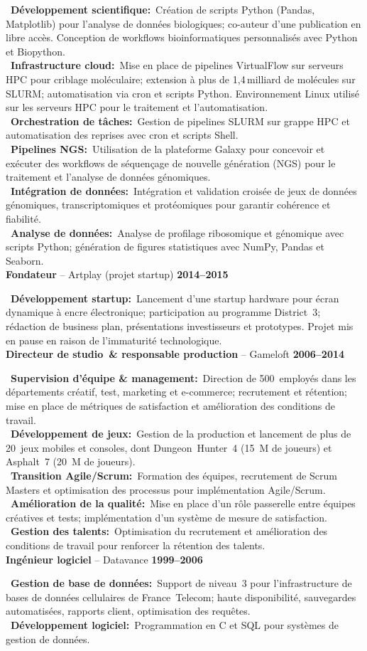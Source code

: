 \documentclass[a4paper,10pt]{article}
\newcommand{\resumeItem}[3]{%
  \noindent\textbf{#1} -- #2 \hfill \textbf{#3} \\
  \vspace{0.3em}
}
\newcommand{\jobItem}[2]{%
  \noindent
  \textbullet\ \textbf{#1\ifthenelse{\boolean{EN}}{}{ }:}~#2\vspace{0.3em} \\
}
\begin{document}
{{    \jobItem{Développement scientifique}{Création de scripts Python (Pandas, Matplotlib) pour l'analyse de données biologiques; co-auteur d’une publication en libre accès. Conception de workflows bioinformatiques personnalisés avec Python et Biopython.}
    \jobItem{Infrastructure cloud}{Mise en place de pipelines VirtualFlow sur serveurs HPC pour criblage moléculaire; extension à plus de 1,4 milliard de molécules sur SLURM; automatisation via cron et scripts Python. Environnement Linux utilisé sur les serveurs HPC pour le traitement et l'automatisation.}
    \jobItem{Orchestration de tâches}{Gestion de pipelines SLURM sur grappe HPC et automatisation des reprises avec cron et scripts Shell.}
    \jobItem{Pipelines NGS}{Utilisation de la plateforme Galaxy pour concevoir et exécuter des workflows de séquençage de nouvelle génération (NGS) pour le traitement et l’analyse de données génomiques.}
    \jobItem{Intégration de données}{Intégration et validation croisée de jeux de données génomiques, transcriptomiques et protéomiques pour garantir cohérence et fiabilité.}
    \jobItem{Analyse de données}{Analyse de profilage ribosomique et génomique avec scripts Python; génération de figures statistiques avec NumPy, Pandas et Seaborn.}
    \vspace{1em}
    \resumeItem{Fondateur}{Artplay (projet startup)}{2014–2015}
    \jobItem{Développement startup}{Lancement d'une startup hardware pour écran dynamique à encre électronique; participation au programme District 3; rédaction de business plan, présentations investisseurs et prototypes. Projet mis en pause en raison de l'immaturité technologique.}
    \vspace{1em}
    \resumeItem{Directeur de studio \& responsable production}{Gameloft}{2006–2014}
    \jobItem{Supervision d'équipe \& management}{Direction de 500 employés dans les départements créatif, test, marketing et e-commerce; recrutement et rétention; mise en place de métriques de satisfaction et amélioration des conditions de travail.}
    \jobItem{Développement de jeux}{Gestion de la production et lancement de plus de 20 jeux mobiles et consoles, dont Dungeon Hunter 4 (15 M de joueurs) et Asphalt 7 (20 M de joueurs).}
    \jobItem{Transition Agile/Scrum}{Formation des équipes, recrutement de Scrum Masters et optimisation des processus pour implémentation Agile/Scrum.}
    \jobItem{Amélioration de la qualité}{Mise en place d'un rôle passerelle entre équipes créatives et tests; implémentation d'un système de mesure de satisfaction.}
    \jobItem{Gestion des talents}{Optimisation du recrutement et amélioration des conditions de travail pour renforcer la rétention des talents.}
    \vspace{1em}
    \resumeItem{Ingénieur logiciel}{Datavance}{1999–2006}
    \jobItem{Gestion de base de données}{Support de niveau 3 pour l'infrastructure de bases de données cellulaires de France Telecom; haute disponibilité, sauvegardes automatisées, rapports client, optimisation des requêtes.}
    \jobItem{Développement logiciel}{Programmation en C et SQL pour systèmes de gestion de données.}
  }
}
\end{document}
